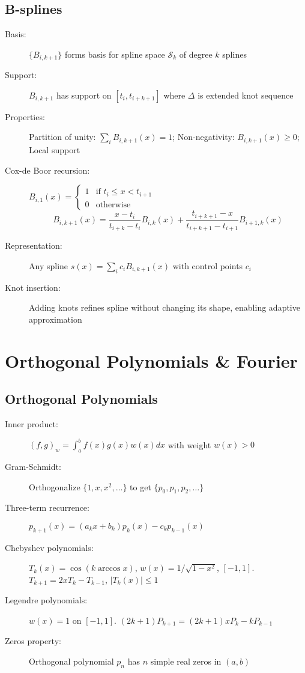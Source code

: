 \documentclass[a4paper,10pt,landscape]{article}
\begin{document}
\begin{multicols*}{3}
    \subsection*{B-splines}
    \begin{description}
        \item[Basis:] $\{B_{i,k+1}\}$ forms basis for spline space $\mathcal{S}_k$ of degree $k$ splines
        \item[Support:] $B_{i,k+1}$ has support on $[t_i,t_{i+k+1}]$ where $\Delta$ is extended knot sequence
        \item[Properties:] Partition of unity: $\sum_i B_{i,k+1}(x) = 1$; Non-negativity: $B_{i,k+1}(x) \geq 0$; Local support
        \item[Cox-de Boor recursion:] $B_{i,1}(x) = \begin{cases} 1 & \text{if } t_i \leq x < t_{i+1} \\ 0 & \text{otherwise} \end{cases}$
              \[B_{i,k+1}(x) = \frac{x-t_i}{t_{i+k}-t_i}B_{i,k}(x) + \frac{t_{i+k+1}-x}{t_{i+k+1}-t_{i+1}}B_{i+1,k}(x)\]
        \item[Representation:] Any spline $s(x) = \sum_i c_i B_{i,k+1}(x)$ with control points $c_i$
        \item[Knot insertion:] Adding knots refines spline without changing its shape, enabling adaptive approximation
    \end{description}


    \section*{Orthogonal Polynomials \& Fourier}
    \subsection*{Orthogonal Polynomials}
    \begin{description}
        \item[Inner product:] $(f,g)_w = \int_a^b f(x)g(x)w(x)dx$ with weight $w(x) > 0$
        \item[Gram-Schmidt:] Orthogonalize $\{1,x,x^2,\ldots\}$ to get $\{p_0,p_1,p_2,\ldots\}$
        \item[Three-term recurrence:] $p_{k+1}(x) = (a_k x + b_k)p_k(x) - c_k p_{k-1}(x)$
        \item[Chebyshev polynomials:] $T_k(x) = \cos(k\arccos x)$, $w(x) = 1/\sqrt{1-x^2}$, $[-1,1]$. $T_{k+1} = 2xT_k - T_{k-1}$, $|T_k(x)| \leq 1$
        \item[Legendre polynomials:] $w(x) = 1$ on $[-1,1]$. $(2k+1)P_{k+1} = (2k+1)xP_k - kP_{k-1}$
        \item[Zeros property:] Orthogonal polynomial $p_n$ has $n$ simple real zeros in $(a,b)$
    \end{description}


\end{multicols*}
\end{document}
